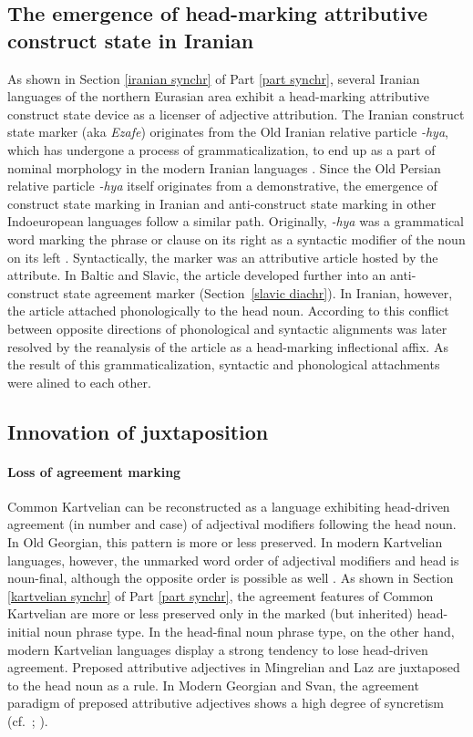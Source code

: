 {\subsection[Head-marking attributive construct state]{The emergence of head-marking attributive construct state in Iranian}\label{iranian diachr}
As shown in Section \ref{iranian synchr} of Part \ref{part synchr}, several Iranian languages of the northern Eurasian area exhibit a head-marking attributive construct state device as a licenser of adjective attribution. The Iranian construct state marker (aka \textit{Ezafe}) originates from the Old Iranian relative particle \textit{-hya}, which has undergone a process of grammaticalization, to end up as a part of nominal morphology in the modern Iranian languages \citep{haider-etal1984,samvelian2007b}. Since the Old Persian relative particle \textit{-hya} itself originates from a demonstrative, the emergence of construct state marking in Iranian and anti-construct state marking in other Indoeuropean languages follow a similar path. Originally, \textit{-hya} was a grammatical word marking the phrase or clause on its right as a syntactic modifier of the noun on its left \citep{haider-etal1984}. Syntactically, the marker was an attributive article hosted by the attribute. In Baltic and Slavic, the article developed further into an anti-construct state agreement marker (Section~\ref{slavic diachr}). In Iranian, however, the article attached phonologically to the head noun. According to \citet[3]{samvelian2007} this conflict between opposite directions of phonological and syntactic alignments was later resolved by the reanalysis of the article as a head-marking inflectional affix. As the result of this grammaticalization, syntactic and phonological attachments were alined to each other.

\subsection[Innovation of juxtaposition]{Innovation of juxtaposition}
\paragraph{Loss of agreement marking}
Common Kartvelian can be reconstructed as a language exhibiting head-driven agreement (in number and case) of adjectival modifiers following the head noun. In Old Georgian, this pattern is more or less preserved. In modern Kartvelian languages, however, the unmarked word order of adjectival modifiers and head is noun-final, although the opposite order is possible as well \cite[56]{harris1991a}. As shown in Section \ref{kartvelian synchr} of Part \ref{part synchr}, the agreement features of Common Kartvelian are more or less preserved only in the marked (but inherited) head-initial noun phrase type. In the head-final noun phrase type, on the other hand, modern Kartvelian languages display a strong tendency to lose head-driven agreement. Preposed attributive adjectives in Mingrelian and Laz are juxtaposed to the head noun as a rule. In Modern Georgian and Svan, the agreement paradigm of preposed attributive adjectives shows a high degree of syncretism (cf.~\citealt[56]{harris1991a}; \citealt[56–60, elsewhere]{tuite1998}).

}
